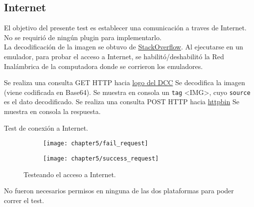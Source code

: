 \subsection{Internet}
El objetivo del presente test es establecer una comunicación a traves de Internet. No se requirió de ningún plugin para implementarlo.\\
La decodificación de la imagen se obtuvo de \href{https://stackoverflow.com/questions/19124701/get-image-using-jquery-ajax-and-decode-it-to-base64/25371174#25371174}{StackOverflow}. Al ejecutarse en un emulador, para probar el acceso a Internet, se habilitó/deshabilitó la Red Inalámbrica de la computadora donde se corrieron los emuladores.\\
\begin{algorithm}
	\begin{algorithmic}[1]
		\STATE Se realiza una consulta GET HTTP hacia \href{https://dcc.fceia.unr.edu.ar/sites/all/themes/birthofcool/images/logo-lcc.png}{logo del DCC}
		\STATE Se decodifica la imagen (viene codificada en Base64).
		\STATE Se muestra en consola un \texttt{tag} \textless IMG\textgreater, cuyo \texttt{source} es el dato decodificado.
		\STATE Se realiza una consulta POST HTTP hacia \href{http://httpbin.org/post}{httpbin}
		\STATE Se muestra en consola la respuesta.
	\end{algorithmic}
	\caption{Test de conexión a Internet.}\label{alg:chap5_test_internet}
\end{algorithm}
\begin{figure}[hbtp]
    \centering
    \begin{subfigure}{.3\linewidth}
		\texttt{[image: chapter5/fail\_request]}
		\label{fig:ch05:fail_request}
	\end{subfigure}
	\begin{subfigure}{.3\linewidth}
		\texttt{[image: chapter5/success\_request]}
		\label{fig:ch05:success_request}
	\end{subfigure}
	\caption{Testeando el acceso a Internet.}
	\label{fig:ch05:internet_test}
\end{figure}
No fueron necesarios permisos en ninguna de las dos plataformas para poder correr el test.
\newpage
